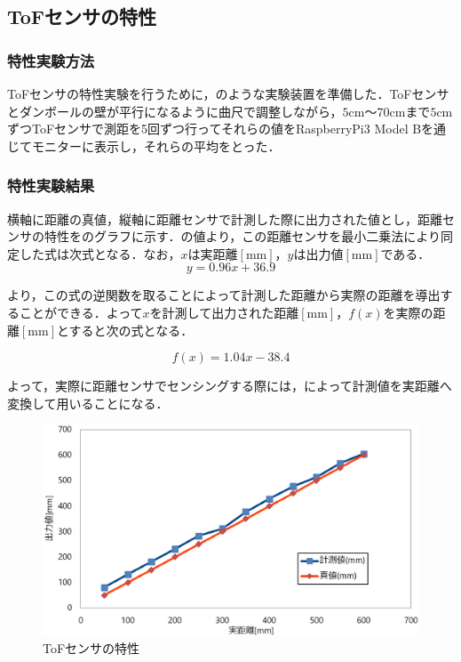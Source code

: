 \subsection{ToFセンサの特性}

\subsubsection{特性実験方法}
ToFセンサの特性実験を行うために，のような実験装置を準備した．ToFセンサとダンボールの壁が平行になるように曲尺で調整しながら，$\mathrm{5cm}〜\mathrm{70cm}$まで$\mathrm{5cm}$ずつToFセンサで測距を5回ずつ行ってそれらの値をRaspberryPi3 Model Bを通じてモニターに表示し，それらの平均をとった．

\subsubsection{特性実験結果}
横軸に距離の真値，縦軸に距離センサで計測した際に出力された値とし，距離センサの特性をのグラフに示す．の値より，この距離センサを最小二乗法により同定した式は次式となる．なお，$x$は実距離$\mathrm{[mm]}$，$y$は出力値$\mathrm{[mm]}$である．
\begin{equation}
  y = 0.96x + 36.9 \label{eq::1pf}
\end{equation}

より，この式の逆関数を取ることによって計測した距離から実際の距離を導出することができる．よって$x$を計測して出力された距離$\mathrm{[mm]}$，$f(x)$を実際の距離$\mathrm{[mm]}$とすると次の式となる．

\begin{equation}
  f(x) = 1.04x - 38.4 \label{eq::2pf}
\end{equation}

よって，実際に距離センサでセンシングする際には，によって計測値を実距離へ変換して用いることになる．

\begin{figure}[htb]
  \centering
  \includegraphics[width=0.5\hsize]{picture/eps/tof_sensor_experiment.eps}
  \caption{ToFセンサの特性}
  \label{fig::tof_graph}
 \end{figure}
